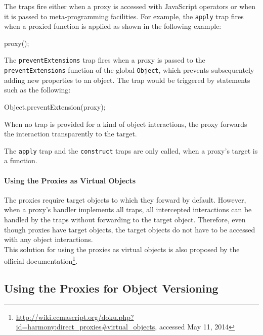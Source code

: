 The traps fire either when a proxy is accessed with JavaScript operators or when it is passed to meta-programming facilities.
For example, the \lstinline{apply} trap fires when a proxied function is applied as shown in the following example:

\begin{code}{}{}
proxy();
\end{code}
\label{lst:example}
\iffalse
\end{verbatim}\fi
The \lstinline{preventExtensions} trap fires when a proxy is passed to the \lstinline{preventExtensions} function of the global \lstinline{Object}, which prevents subsequentely adding new properties to an object.
The trap would be triggered by statements such as the following:

\begin{code}{}{}
Object.preventExtension(proxy);
\end{code}
\label{lst:example}
\iffalse
\end{verbatim}\fi

When no trap is provided for a kind of object interactions, the proxy forwards the interaction transparently to the target.

The \lstinline{apply} trap and the \lstinline{construct} traps are only called, when a proxy's target is a function.

\paragraph{Using the Proxies as Virtual Objects}
The proxies require target objects to which they forward by default.
However, when a proxy's handler implements all traps, all intercepted interactions can be handled by the traps without forwarding to the target object.
Therefore, even though proxies have target objects, the target objects do not have to be accessed with any object interactions.
\\
This solution for using the proxies as virtual objects is also proposed by the official documentation\footnote{\url{http://wiki.ecmascript.org/doku.php?id=harmony:direct\_proxies\#virtual_objects}, accessed May 11, 2014}.



\subsection{Using the Proxies for Object Versioning} \label{subsec:IMPLEMENTATION:1.2}

